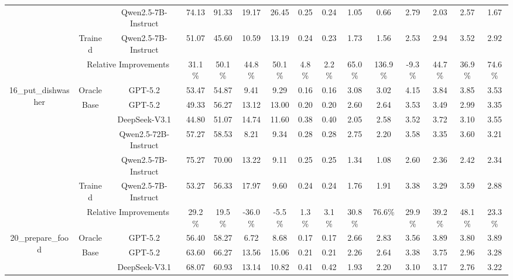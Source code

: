 \documentclass{article}
\theoremstyle{plain}
\theoremstyle{definition}
\theoremstyle{remark}
\begin{document}
\begin{table}[htbp]
{\begin{tabular}{c|c|r|cccccc|cccccc}
            &       & \multicolumn{1}{c|}{Qwen2.5-7B-Instruct} & 74.13  & 91.33  & 19.17  & 26.45  & 0.25  & 0.24  & 1.05  & 0.66  & 2.79  & 2.03  & 2.57  & 1.67  \\
  \cmidrule{2-15}          & Trained & \multicolumn{1}{c|}{Qwen2.5-7B-Instruct} & 51.07  & 45.60  & 10.59  & 13.19  & 0.24  & 0.23  & 1.73  & 1.56  & 2.53  & 2.94  & 3.52  & 2.92  \\
  \cmidrule{2-15}          & \multicolumn{2}{c|}{Relative Improvements} & 31.1\% & 50.1\% & 44.8\% & 50.1\% & 4.8\% & 2.2\% & 65.0\% & 136.9\% & -9.3\% & 44.7\% & 36.9\% & 74.6\% \\
      \midrule
      \multirow{7}[8]{*}{16\_put\_dishwasher} & \multicolumn{1}{c}{Oracle} & \multicolumn{1}{c}{GPT-5.2} & 53.47 & 54.87 & 9.41 & 9.29 & 0.16 & 0.16 & 3.08 & 3.02 & 4.15 & 3.84 & 3.85 & 3.53  \\
\cmidrule{2-15} & \multirow{4}[2]{*}{Base} & \multicolumn{1}{c|}{GPT-5.2} & 49.33 & 56.27 & 13.12 & 13.00 & 0.20 & 0.20 & 2.60 & 2.64 & 3.53 & 3.49 & 2.99 & 3.35  \\
            &       & \multicolumn{1}{c|}{DeepSeek-V3.1} & 44.80  & 51.07  & 14.74  & 11.60  & 0.38  & 0.40  & 2.05  & 2.58  & 3.52  & 3.72  & 3.10  & 3.55  \\
            &       & \multicolumn{1}{c|}{Qwen2.5-72B-Instruct} & 57.27  & 58.53  & 8.21  & 9.34  & 0.28  & 0.28  & 2.75  & 2.20  & 3.58  & 3.35  & 3.60  & 3.21  \\
            &       & \multicolumn{1}{c|}{Qwen2.5-7B-Instruct} & 75.27  & 70.00  & 13.22  & 9.11  & 0.25  & 0.25  & 1.34  & 1.08  & 2.60  & 2.36  & 2.42  & 2.34  \\
  \cmidrule{2-15}          & Trained & \multicolumn{1}{c|}{Qwen2.5-7B-Instruct} & 53.27  & 56.33  & 17.97  & 9.60  & 0.24  & 0.24  & 1.76  & 1.91  & 3.38  & 3.29  & 3.59  & 2.88  \\
  \cmidrule{2-15}          & \multicolumn{2}{c|}{Relative Improvements} & 29.2\% & 19.5\% & -36.0\% & -5.5\% & 1.3\% & 3.1\% & 30.8\% & 76.6\% & 29.9\% & 39.2\% & 48.1\% & 23.3\% \\
      \midrule
      \multirow{7}[8]{*}{20\_prepare\_food} & Oracle & \multicolumn{1}{c|}{GPT-5.2} & 56.40 & 58.27 & 6.72 & 8.68 & 0.17 & 0.17 & 2.66 & 2.83 & 3.56 & 3.89 & 3.80 & 3.89  \\
\cmidrule{2-15} & \multirow{4}[2]{*}{Base} & \multicolumn{1}{c|}{GPT-5.2} & 63.60 & 66.27 & 13.56 & 15.06 & 0.21 & 0.21 & 2.26 & 2.64 & 3.38 & 3.75 & 2.96 & 3.28  \\
            &       & \multicolumn{1}{c|}{DeepSeek-V3.1} & 68.07  & 60.93  & 13.14  & 10.82  & 0.41  & 0.42  & 1.93  & 2.20  & 3.10  & 3.17  & 2.76  & 3.22  \\

\end{tabular}}
\end{table}
\end{document}
